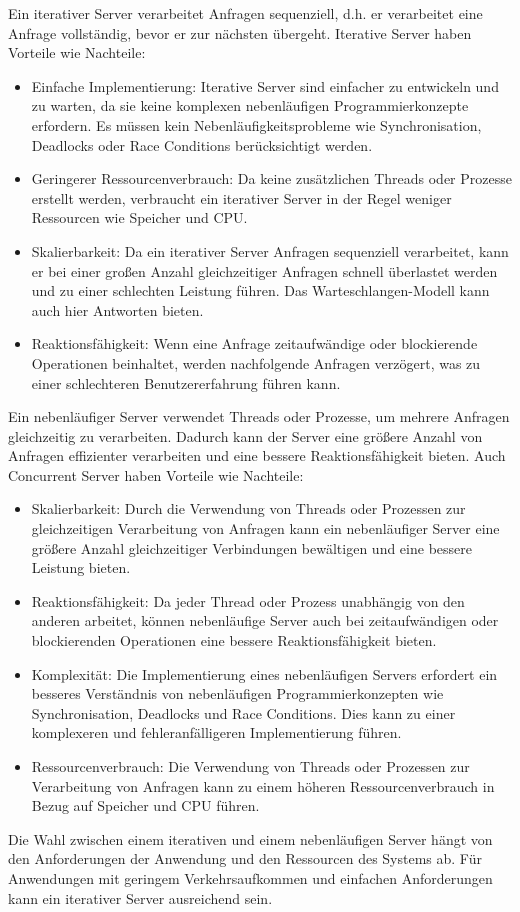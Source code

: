 Ein iterativer Server verarbeitet Anfragen sequenziell, d.h. er verarbeitet eine Anfrage vollständig, bevor er zur nächsten übergeht.  Iterative Server haben Vorteile wie Nachteile:
\begin{itemize}
\item Einfache Implementierung: Iterative Server sind einfacher zu entwickeln und zu warten, da sie keine komplexen nebenläufigen Programmierkonzepte erfordern. Es müssen kein Nebenläufigkeitsprobleme wie Synchronisation, Deadlocks oder Race Conditions berücksichtigt werden.
\item Geringerer Ressourcenverbrauch: Da keine zusätzlichen Threads oder Prozesse erstellt werden, verbraucht ein iterativer Server in der Regel weniger Ressourcen wie Speicher und CPU.
\item Skalierbarkeit: Da ein iterativer Server Anfragen sequenziell verarbeitet, kann er bei einer großen Anzahl gleichzeitiger Anfragen schnell überlastet werden und zu einer schlechten Leistung führen. Das Warteschlangen-Modell kann auch hier Antworten bieten.
\item Reaktionsfähigkeit: Wenn eine Anfrage zeitaufwändige oder blockierende Operationen beinhaltet, werden nachfolgende Anfragen verzögert, was zu einer schlechteren Benutzererfahrung führen kann.
\end{itemize}
Ein nebenläufiger Server verwendet Threads oder Prozesse, um mehrere Anfragen gleichzeitig zu verarbeiten. Dadurch kann der Server eine größere Anzahl von Anfragen effizienter verarbeiten und eine bessere Reaktionsfähigkeit bieten. Auch Concurrent Server haben Vorteile wie Nachteile:

\begin{itemize}
\item Skalierbarkeit: Durch die Verwendung von Threads oder Prozessen zur gleichzeitigen Verarbeitung von Anfragen kann ein nebenläufiger Server eine größere Anzahl gleichzeitiger Verbindungen bewältigen und eine bessere Leistung bieten.
\item Reaktionsfähigkeit: Da jeder Thread oder Prozess unabhängig von den anderen arbeitet, können nebenläufige Server auch bei zeitaufwändigen oder blockierenden Operationen eine bessere Reaktionsfähigkeit bieten.
\item Komplexität: Die Implementierung eines nebenläufigen Servers erfordert ein besseres Verständnis von nebenläufigen Programmierkonzepten wie Synchronisation, Deadlocks und Race Conditions. Dies kann zu einer komplexeren und fehleranfälligeren Implementierung führen.
\item Ressourcenverbrauch: Die Verwendung von Threads oder Prozessen zur Verarbeitung von Anfragen kann zu einem höheren Ressourcenverbrauch in Bezug auf Speicher und CPU führen.
\end{itemize}
Die Wahl zwischen einem iterativen und einem nebenläufigen Server hängt von den Anforderungen der Anwendung und den Ressourcen des Systems ab. Für Anwendungen mit geringem Verkehrsaufkommen und einfachen Anforderungen kann ein iterativer Server ausreichend sein.


